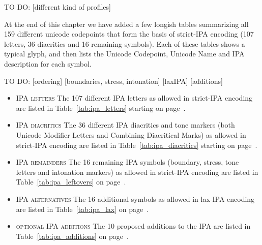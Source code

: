 TO DO: 
[different kind of profiles]

At the end of this chapter we have added a few longish tables summarizing all
159 different unicode codepoints that form the basis of strict-IPA encoding
(107 letters, 36 diacritics and 16 remaining symbols). Each of
these tables shows a typical glyph, and then lists the Unicode Codepoint,
Unicode Name and IPA description for each symbol.

TO DO:
[ordering]
[boundaries, stress, intonation]
[laxIPA]
[additions]


\begin{itemize}[itemsep=6pt]

  \item \textsc{IPA letters} \newline
        The 107 different IPA letters as allowed in strict-IPA encoding are
        listed in Table~\ref{tab:ipa_letters} starting on
        page~\pageref{tab:ipa_letters}.
  \item \textsc{IPA diacritics} \newline The 36 different IPA diacritics and
        tone markers (both Unicode Modifier Letters and Combining Diacritical
        Marks) as allowed in strict-IPA encoding are listed in
        Table~\ref{tab:ipa_diacritics} starting on
        page~\pageref{tab:ipa_diacritics}.
  \item \textsc{IPA remainders} \newline The 16 remaining IPA symbols
        (boundary, stress, tone letters and intonation markers) as allowed in strict-IPA
        encoding are listed in Table~\ref{tab:ipa_leftovers} on
        page~\pageref{tab:ipa_leftovers}.
  \item \textsc{IPA alternatives} \newline The 16 additional symbols as allowed in
        lax-IPA encoding are listed in Table~\ref{tab:ipa_lax} on
        page~\pageref{tab:ipa_lax}.     
  \item \textsc{optional IPA additions} \newline
        The 10 proposed additions to the IPA are listed in
        Table~\ref{tab:ipa_additions} on page~\pageref{tab:ipa_additions}.
  
\end{itemize}


\newpage





